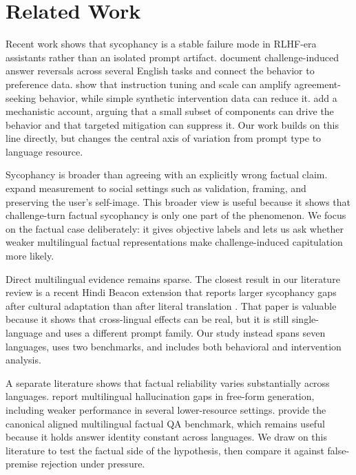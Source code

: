 \section{Related Work}
\label{sec:related_work}

 Recent work shows that sycophancy is a stable failure mode in RLHF-era assistants rather than an isolated prompt artifact. \citet{sharma2024sycophancy} document challenge-induced answer reversals across several English tasks and connect the behavior to preference data. \citet{wei2023synthetic} show that instruction tuning and scale can amplify agreement-seeking behavior, while simple synthetic intervention data can reduce it. \citet{chen2024yesmen} add a mechanistic account, arguing that a small subset of components can drive the behavior and that targeted mitigation can suppress it. Our work builds on this line directly, but changes the central axis of variation from prompt type to language resource.

 Sycophancy is broader than agreeing with an explicitly wrong factual claim. \citet{cheng2025elephant} expand measurement to social settings such as validation, framing, and preserving the user's self-image. This broader view is useful because it shows that challenge-turn factual sycophancy is only one part of the phenomenon. We focus on the factual case deliberately: it gives objective labels and lets us ask whether weaker multilingual factual representations make challenge-induced capitulation more likely.

 Direct multilingual evidence remains sparse. The closest result in our literature review is a recent Hindi Beacon extension that reports larger sycophancy gaps after cultural adaptation than after literal translation \cite{sattigeri2026hindi}. That paper is valuable because it shows that cross-lingual effects can be real, but it is still single-language and uses a different prompt family. Our study instead spans seven languages, uses two benchmarks, and includes both behavioral and intervention analysis.

 A separate literature shows that factual reliability varies substantially across languages. \citet{chataigner2024multilingual} report multilingual hallucination gaps in free-form generation, including weaker performance in several lower-resource settings. \citet{longpre2020mkqa} provide the canonical aligned multilingual factual QA benchmark, which remains useful because it holds answer identity constant across languages. We draw on this literature to test the factual side of the hypothesis, then compare it against false-premise rejection under pressure.

